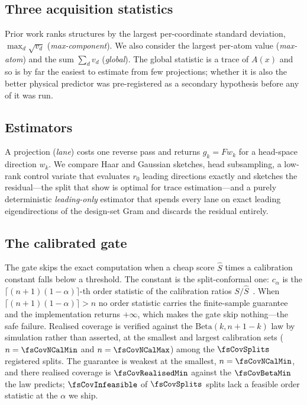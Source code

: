 \subsection{Three acquisition statistics}
Prior work ranks structures by the largest per-coordinate standard deviation,
$\max_d\sqrt{v_d}$ (\emph{max-component}). We also consider the largest per-atom
value (\emph{max-atom}) and the sum $\sum_d v_d$ (\emph{global}). The global
statistic is a trace of $A(x)$ and so is by far the easiest to estimate from few
projections; whether it is also the better physical predictor was pre-registered
as a secondary hypothesis before any of it was run.

\subsection{Estimators}
A projection (\emph{lane}) costs one reverse pass and returns $g_k=F w_k$ for a
head-space direction $w_k$. We compare Haar and Gaussian sketches, head
subsampling, a low-rank control variate that evaluates $r_0$ leading directions
exactly and sketches the residual---the split that
\citet{meyer2021hutchpp} show is optimal for trace estimation---and a purely deterministic
\emph{leading-only} estimator that spends every lane on exact leading
eigendirections of the design-set Gram and discards the residual entirely.

\subsection{The calibrated gate}
The gate skips the exact computation when a cheap score $\hat{S}$ times a
calibration constant falls below a threshold. The constant is the
split-conformal one: $c_\alpha$ is the
$\lceil (n+1)(1-\alpha)\rceil$-th order statistic of the calibration ratios
$S/\hat{S}$~\citep{vovk2005algorithmic,lei2018distribution}. When
$\lceil (n+1)(1-\alpha)\rceil > n$ no order statistic carries the finite-sample
guarantee and the implementation returns $+\infty$, which makes the gate skip
nothing---the safe failure. Realised coverage is verified against the
$\mathrm{Beta}(k,n{+}1{-}k)$ law by simulation rather than asserted, at the
smallest and largest calibration sets ($n=\fsCovNCalMin$ and $n=\fsCovNCalMax$) among
the $\fsCovSplits$ registered splits.
The guarantee is weakest at the smallest, $n=\fsCovNCalMin$, and there realised
coverage is $\fsCovRealisedMin$ against the $\fsCovBetaMin$ the law predicts;
$\fsCovInfeasible$ of $\fsCovSplits$ splits lack a feasible order statistic at
the $\alpha$ we ship.

